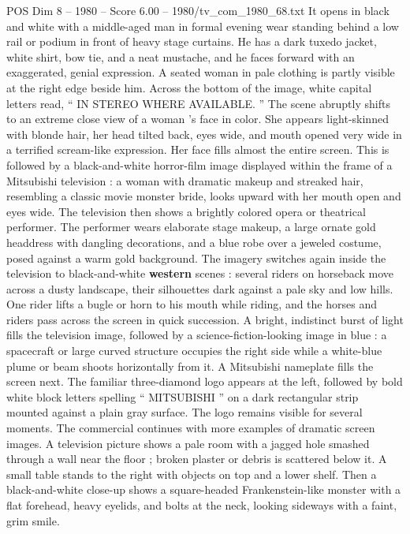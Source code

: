 \begin{textsample}{POS Dim 8 – 1980 – Score 6.00 – 1980/tv\_com\_1980\_68.txt}  \label{ex:f8_pos_048}
It opens in black and white with a middle-aged man in formal evening wear standing behind a low rail or podium in front of heavy stage curtains.
He has a dark tuxedo jacket, white shirt, bow tie, and a neat mustache, and he faces forward with an exaggerated, genial expression.
A seated woman in pale clothing is partly visible at the right edge beside him.
Across the bottom of the image, white capital letters read, “ IN STEREO WHERE AVAILABLE. ” The scene abruptly shifts to an extreme close view of a woman ’s face in color.
She appears light-skinned with blonde hair, her head tilted back, eyes wide, and mouth opened very wide in a terrified scream-like expression.
Her face fills almost the entire screen.
This is followed by a black-and-white horror-film image displayed within the frame of a Mitsubishi television : a woman with dramatic makeup and streaked hair, resembling a classic movie monster bride, looks upward with her mouth open and eyes wide.
The television then shows a brightly colored opera or theatrical performer.
The performer wears elaborate stage makeup, a large ornate gold headdress with dangling decorations, and a blue robe over a jeweled costume, posed against a warm gold background.
The imagery switches again inside the television to black-and-white \textbf{western} scenes : several riders on horseback move across a dusty landscape, their silhouettes dark against a pale sky and low hills.
One rider lifts a bugle or horn to his mouth while riding, and the horses and riders pass across the screen in quick succession.
A bright, indistinct burst of light fills the television image, followed by a science-fiction-looking image in blue : a spacecraft or large curved structure occupies the right side while a white-blue plume or beam shoots horizontally from it.
A Mitsubishi nameplate fills the screen next.
The familiar three-diamond logo appears at the left, followed by bold white block letters spelling “ MITSUBISHI ” on a dark rectangular strip mounted against a plain gray surface.
The logo remains visible for several moments.
The commercial continues with more examples of dramatic screen images.
A television picture shows a pale room with a jagged hole smashed through a wall near the floor ; broken plaster or debris is scattered below it.
A small table stands to the right with objects on top and a lower shelf.
Then a black-and-white close-up shows a square-headed Frankenstein-like monster with a flat forehead, heavy eyelids, and bolts at the neck, looking sideways with a faint, grim smile.

\end{textsample}
